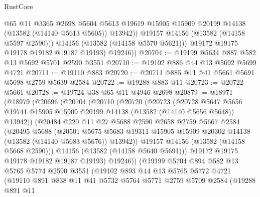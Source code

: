 \begin{lexlean}{RustCore}
\begin{coremodule}
                  @65
                  @11
                  @3365
                  @2698
                  @5604
                  @5613
                  @19619
                  @15905
                  @15909
                  @20199
                  @14138
                  (@13582 (@14140 @5613 @5605))
                  @13942))
              @19157
              @14156
              (@13582 (@14158 @5597 @2590)))
            @14156
            (@13582 (@14158 @5570 @5621)))
          @19172
          @19175
          @19178
          @19182
          @19187
          @19193)
        @19246))
@20704 := @19199 @5634 @887 @582 @13 @5692 @5701 @2590 @3551
@20710 := @19102 @886 @44 @13 @5692 @5699 @4721
@20711 := @19110 @883
@20720 := @20711 @885 @11 @41 @5661 @5691 @5698 @2759 @5639 @2584
@20722 := @19288 @883 @11
@20723 := @20722 @5661
@20728 := @19724 @38 @65 @11 @4946 @2698
@20879 := @18971
    (@18979
      (@20696
        (@20704
          (@20710
            (@20720
              (@20723
                (@20728
                  @5647
                  @5656
                  @19741
                  @15905
                  @15909
                  @20199
                  @14138
                  (@13582 (@14140 @5656 @5648))
                  @13942))
              (@20484
                @220
                @11
                @27
                @5688
                @2590
                @2658
                @2759
                @5667
                @2584
                (@20495
                  @5688
                  (@20501
                    @5675
                    @5683
                    @19311
                    @15905
                    @15909
                    @20302
                    @14138
                    (@13582 (@14140 @5683 @5676))
                    @13942))
                @19157
                @14156
                (@13582 (@14158 @5668 @2590)))
              @14156
              (@13582 (@14158 @5640 @5691)))
            @19172
            @19175
            @19178
            @19182
            @19187
            @19193)
          @19246))
      (@19199
        @5704
        @894
        @582
        @13
        @5765
        @5774
        @2590
        @3551
        (@19102
          @893
          @44
          @13
          @5765
          @5772
          @4721
          (@19110
            @891
            @838
            @11
            @41
            @5732
            @5764
            @5771
            @2759
            @5709
            @2584
            (@19288
              @891
              @11

\end{coremodule}
\end{lexlean}
